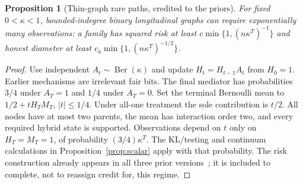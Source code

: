 \documentclass[11pt,a4paper]{article}
\numberwithin{equation}{section}
\newtheorem{proposition}[theorem]{Proposition}
\theoremstyle{definition}
\begin{document}
\begin{proposition}[Thin-graph rare paths, credited to the priors]\label{prop:rarepath}
For fixed $0<\kappa<1$, bounded-indegree binary longitudinal graphs
can require exponentially many observations: a family has squared risk
at least $c\min\{1,(n\kappa^T)^{-1}\}$ and honest diameter at least
$c_a\min\{1,(n\kappa^T)^{-1/2}\}$.
\end{proposition}
\begin{proof}
Use independent $A_t\sim\operatorname{Ber}(\kappa)$ and update
$H_t=H_{t-1}A_t$ from $H_0=1$. Earlier mechanisms are irrelevant fair
bits. The final mediator has probabilities $3/4$ under $A_T=1$ and
$1/4$ under $A_T=0$. Set the terminal Bernoulli mean to
$1/2+tH_TM_T$, $|t|\le1/4$. Under all-one treatment the sole contribution
is $t/2$. All nodes have at most two parents, the mean has interaction
order two, and every required hybrid state is supported. Observations
depend on $t$ only on $H_T=M_T=1$, of probability
$(3/4)\kappa^T$. The KL/testing and continuum calculations in
Proposition~\ref{prop:scalar} apply with that probability. The risk
construction already appears in all three prior versions~\cite{prior};
it is included to complete, not to reassign credit for, this regime.
\end{proof}
\end{document}
